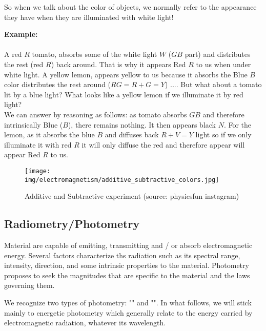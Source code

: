 	So when we talk about the color of objects, we normally refer to the appearance they have when they are illuminated with white light!
	\begin{tcolorbox}[colframe=black,colback=white,sharp corners]
	\textbf{{\Large {}}Example:}\\\\
	A red $R$ tomato, absorbs some of the white light $W$ ($GB$ part) and distributes the rest (red $R$) back around. That is why it appears Red $R$ to us when under white light. A yellow lemon, appears yellow to us because it absorbs the Blue $B$ color distributes the rest around ($RG=R+G=Y$) .... But what about a tomato lit by a blue light? What looks like a yellow lemon if we illuminate it by red light?\\
	
	We can answer by reasoning as follows: as tomato absorbs $GB$ and therefore intrinsically Blue ($B$), there remains nothing. It then appears black $N$. For the lemon, as it absorbs the blue $B$ and diffuses back $R + V=Y$ light so if we only illuminate it with red $R$ it will only diffuse the red and therefore appear will appear Red $R$ to us.
	\end{tcolorbox}
	\begin{figure}[H]
		\centering
		\texttt{[image: img/electromagnetism/additive\_subtractive\_colors.jpg]}
		\caption{Additive and Subtractive experiment (source: physicsfun instagram)}
	\end{figure}
	
	\pagebreak
	\subsection{Radiometry/Photometry}
	Material are capable of emitting, transmitting and / or absorb electromagnetic energy. Several factors characterize ths radiation such as its spectral range, intensity, direction, and some intrinsic properties to the material. Photometry proposes to seek the magnitudes that are specific to the material and the laws governing them.
	
	We recognize two types of photometry: "" and "". In what follows, we will stick mainly to energetic photometry which generally relate to the energy carried by electromagnetic radiation, whatever its wavelength.
	

